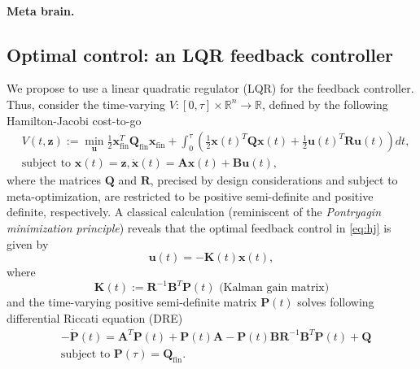 \documentclass{article} %
\def\B#1{\bm{#1}}
\newcommand{\R}{\mathbb{R}}
\def\u{\mathbf{u}}
\def\z{\mathbf{z}}
\def\A{\mathbf{A}}
\def\B{\mathbf{B}}
\def\R{\mathbf{R}}
\def\Q{\mathbf{Q}}
\def\P{\mathbf{P}}
\def\K{\mathbf{K}}
\def\x{\mathbf{x}}
\begin{document}
\paragraph{Meta brain.}

\subsection{Optimal control: an LQR feedback controller}
We propose to use a linear quadratic regulator (LQR) for the feedback controller. Thus, consider the time-varying  $V: [0, \tau] \times \mathbb R^n \rightarrow \mathbb R$, defined by the following Hamilton-Jacobi cost-to-go
\begin{equation}
  \begin{split}
    &V(t, \z) := \min_{\u} \frac{1}{2}\x_{\text{fin}}^T\Q_{\text{fin}}\x_{\text{fin}} + \int_{0}^\tau\left(\frac{1}{2}\x(t)^T\Q\x(t) + \frac{1}{2}\u(t)^T\R\u(t)\right)dt,\\
    &\text{subject to } \x(t) = \z, \dot{\x}(t) = \A\x(t) + \B\u(t),
  \end{split}
  \label{eq:hj}
\end{equation}
where the matrices $\Q$ and $\R$, precised by design considerations and subject to meta-optimization, are restricted to be positive semi-definite and positive definite, respectively. A classical calculation (reminiscent of the \textit{Pontryagin minimization principle}) reveals that the optimal feedback control in \eqref{eq:hj} is given by
\begin{equation}
  \u(t) = -\K(t)\x(t),
\end{equation}
where
\begin{equation}
  \K(t) := \R^{-1}\B^T\P(t)\text{ (Kalman gain matrix)}
\end{equation}
and the time-varying positive semi-definite matrix $\P(t)$ solves following differential Riccati equation (DRE)
\begin{equation}
\begin{split}
&-\dot{\P}(t) = \A^T\P(t) + \P(t)\A - \P(t)\B\R^{-1}\B^T\P(t) + \Q\\
&\text{subject to }\P(\tau) = \Q_{\text{fin}}.
\end{split}
\end{equation}
\end{document}
